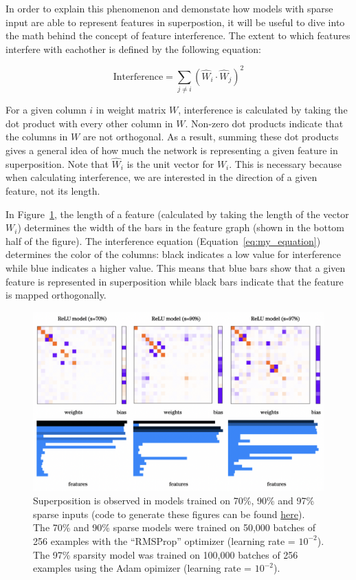 \documentclass{article} %
\begin{document}
In order to explain this phenomenon and demonstate how models with sparse input
are able to represent features in superpostion, it will be useful to dive into 
the math behind the concept of feature interference. The extent to which 
features interfere with eachother is defined by the following equation:

\begin{equation}
\label{eq:my_equation}
\text{Interference} = \sum_{j \neq i} (\hat{W}_i \cdot \hat{W}_j)^2
\end{equation}

For a given column $i$ in weight matrix $W$, interference is calculated by taking
the dot product with every other column in $W$. Non-zero dot products indicate
that the columns in $W$ are not orthogonal. As a result, summing these dot 
products gives a general idea of how much the network is representing a given
feature in superposition. Note that $\hat{W}_i$ is the unit vector for $W_i$. 
This is necessary because when calculating interference, we are interested in
the direction of a given feature, not its length.\newline

In Figure~\ref{fig:sparsity_1}, the length of a feature (calculated by taking the
length of the vector $W_i$) determines the width of the bars in the feature
graph (shown in the bottom half of the figure). The interference equation (Equation~\ref{eq:my_equation}) determines the
color of the columns: black indicates a low value for interference
while blue indicates a higher value. This means that blue bars show that a given feature is represented
in superposition while black bars indicate that the feature is mapped orthogonally.
    

\begin{figure}[h]
    \centering
    \includegraphics[width=0.75\linewidth]{demonstrating_superposition/images/sparsity_superposition1.png}
    \captionsetup{font=footnotesize, width=0.71\linewidth} %
    \caption{
        Superposition is observed in models trained on 70\%, 90\% and 97\% 
        sparse inputs (code to generate these figures can be found 
        \href{https://github.com/zroe1/toy_models_of_superposition/blob/main/section_1/section_1.ipynb}{here}). 
        The 70\% and 90\% sparse models were trained on 50,000 batches of 256 
        examples with the ``RMSProp'' optimizer (learning rate = $10^{-2}$). The 
        97\% sparsity model was trained on 100,000 batches of 256 examples using 
        the Adam opimizer (learning rate = $10^{-2}$).
    }
    \label{fig:sparsity_1}
\end{figure}
\end{document}
